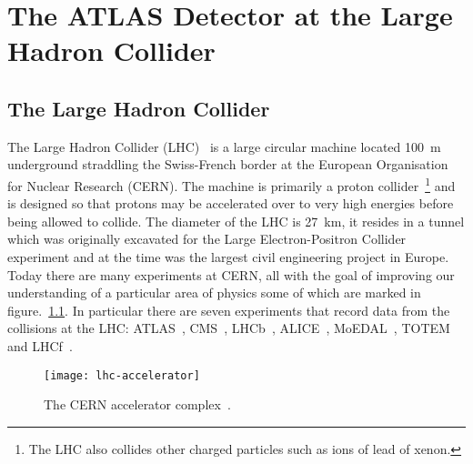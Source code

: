  \chapter{The ATLAS Detector at the Large Hadron Collider}%
\label{sec:detector}

\section{The Large Hadron Collider}%
\label{sec:lhc}%
The Large Hadron Collider (LHC)~\cite{LHC-dr} is a large circular machine
located 100~m underground straddling the Swiss-French border at the European
Organisation for Nuclear Research (CERN). The machine is primarily a proton
collider~\footnote{The LHC also collides other charged particles such as ions of
  lead of xenon.} and is designed so that protons may be accelerated
over to very high energies before being allowed to collide. The diameter of the
LHC is 27~km, it resides in a tunnel which was originally excavated for the
Large Electron-Positron Collider~\cite{LEP} experiment and at the time was the
largest civil engineering project in Europe. Today there are many experiments at
CERN, all with the goal of improving our understanding of a particular area of
physics some of which are marked in figure.~\ref{fig:lhc-acc}. In particular
there are seven experiments that record data from the collisions at the LHC:
ATLAS~\cite{ATLAS-loi}, CMS~\cite{CMS-loi}, LHCb~\cite{lhcb-loi},
ALICE~\cite{ALICE-loi}, MoEDAL~\cite{MoEDAL-loi}, TOTEM~\cite{TOTEM-loi} and
LHCf~\cite{lhcf-loi}.
\begin{figure}[h]
  \centering
  \texttt{[image: lhc-accelerator]}
  \caption[The CERN accelerator complex]{The CERN accelerator complex~\cite{LHC-acc-fig}.}%
  \label{fig:lhc-acc}
\end{figure}

